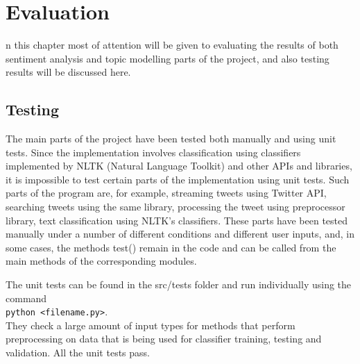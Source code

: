 \let\textcircled=\pgftextcircled
\chapter{Evaluation}
\label{chap:evaluation}

n this chapter most of attention will be given to evaluating the results of both sentiment analysis and topic modelling parts of the project, and also testing results will be discussed here.

\section{Testing}
\label{sec:testing}

The main parts of the project have been tested both manually and using unit tests. 
Since the implementation involves classification using classifiers implemented by NLTK (Natural Language Toolkit) and other APIs and libraries, it is impossible to test certain parts of the implementation using unit tests. Such parts of the program are, for example, streaming tweets using Twitter API, searching tweets using the same library, processing the tweet using preprocessor library, text classification using NLTK's classifiers. These parts have been tested manually under a number of different conditions and different user inputs, and, in some cases, the methods test() remain in the code and can be called from the main methods of the corresponding modules. 

The unit tests can be found in the src/tests folder and run individually using the command \\ \texttt{python <filename.py>}. \\ They check a large amount of input types for methods that perform preprocessing on data that is being used for classifier training, testing and validation. All the unit tests pass. 
